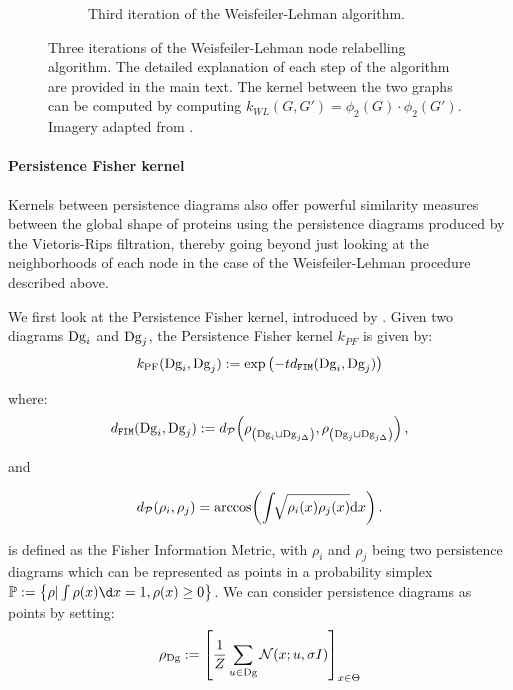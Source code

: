 \begin{figure}
\begin{subfigure}[b]{0.5\textwidth}
    \captionsetup{width=1.4\linewidth}
    \caption{Third iteration of the Weisfeiler-Lehman algorithm.}
  \end{subfigure}
  \caption[Three iterations of the Weisfeiler-Lehman algorithm.]{Three
iterations of the Weisfeiler-Lehman node relabelling algorithm. The detailed
explanation of each step of the algorithm are provided in the main text. The
kernel between the two graphs can be computed by computing
$k_{WL}(G,G')=\phi_2(G)\cdot\phi_2(G')$. Imagery adapted from
\cite{mengin2019}.}
  \label{fig:wl_algo}
\end{figure}

\paragraph{Persistence Fisher kernel} Kernels between persistence diagrams
also offer powerful similarity measures between the global shape of proteins
using the persistence diagrams produced by the Vietoris-Rips filtration, thereby
going beyond just looking at the neighborhoods of each node in the case of the
Weisfeiler-Lehman procedure described above.

We first look at the Persistence Fisher kernel, introduced by
\cite{le2018persistence}. Given two diagrams $\textnormal{Dg}_i$ and $\textnormal{Dg}_j$, the Persistence
Fisher kernel $k_{PF}$ is given by:
\begin{equation}
  \label{eq:kpf}
  k_{\text{PF}}(\textnormal{Dg}_i, \textnormal{Dg}_j ) :=\exp\left(-td_{\texttt{FIM}}(\textnormal{Dg}_i,\textnormal{Dg}_j)\right)
\end{equation}

where:
\begin{equation}
  \label{eq:dfim}
  d_{\texttt{FIM}}(\textnormal{Dg}_i, \textnormal{Dg}_j) := d_{\mathcal{P}} \! \left(\rho_{\left(\textnormal{Dg}_i \cup \text{Dg}_{j\Delta}\right)}, \rho_{\left(\textnormal{Dg}_j \cup \text{Dg}_{j\Delta}\right)} \right),
\end{equation}

and

\begin{equation}\label{equ:dFIM}
  d_{\mathcal{P}}(\rho_i, \rho_j) = \arccos \! \left(\int \!\!\sqrt{\rho_i(x) \rho_j(x)} \mathrm{d}x \right).
\end{equation}

is defined as the Fisher Information Metric, with $\rho_i$ and  $\rho_j$ being
two persistence diagrams which can be represented as points in a probability
simplex $\bbp := \left\{ \rho|\int\rho(x)\d x=1,\rho(x)\geq 0\right\}$. We can
consider persistence diagrams as points by setting:
\begin{equation}
  \label{eq:pdsaspoints}
  \rho_{\textnormal{Dg}} := \left[ {1\over Z} \sum_{u\in\textnormal{Dg}}\mathcal{N}(x;u,\sigma I)\right]_{x\in\Theta}
\end{equation}

